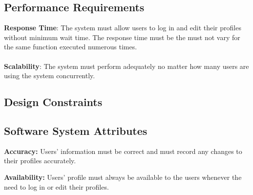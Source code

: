 \subsection{Performance Requirements}
\begin{itemize}
\textbf{Response Time}: The system must allow users to log in and edit their profiles without  minimum wait time. The response time must be the must not vary for the same function executed numerous times.\\	\\

\textbf{Scalability}: The system must perform adequately no matter how many users are using the system concurrently.
	
\end{itemize}
\subsection{Design Constraints}
\begin{enumerate}
	
\end{enumerate}
\subsection{Software System Attributes}
{ 
    \begin{flushleft}
    \par\textbf{Accuracy: }Users' information must be correct and must record any changes to their profiles accurately.\newline
    
    \par\textbf{Availability: }Users' profile must always be available to the users whenever the need to log in or edit their profiles.\newline
    \end{flushleft}
}


